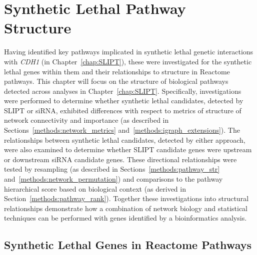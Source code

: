 \chapter{Synthetic Lethal Pathway Structure}
\label{chap:Pathways}
  
Having identified key \glspl{pathway} implicated in \gls{synthetic lethal} genetic interactions with \textit{CDH1} (in Chapter~\ref{chap:SLIPT}), these were investigated for the \gls{synthetic lethal} genes within them and their relationships to  structure in Reactome \glspl{pathway}. This chapter will focus on the  structure of biological \glspl{pathway} detected across analyses in Chapter~\ref{chap:SLIPT}. 
%
Specifically, investigations were performed to determine whether \gls{synthetic lethal} candidates, detected by \gls{SLIPT} or \gls{siRNA}, exhibited differences with respect to metrics of  structure of network connectivity and importance (as described in Sections~\ref{methods:network_metrics} and~\ref{methods:igraph_extensions}). The relationships between \gls{synthetic lethal} candidates, detected by either approach, were also examined to determine whether \gls{SLIPT} candidate genes were upstream or downstream \gls{siRNA} candidate genes. These directional relationships were tested by resampling (as described in Sections~\ref{methods:pathway_str} and~\ref{methods:network_permutation}) and comparisons to the \gls{pathway} hierarchical score based on biological context (as derived in Section~\ref{methods:pathway_rank}). 
%
Together these investigations into structural relationships demonstrate how a combination of network biology and statistical techniques can be performed with genes identified by a \gls{bioinformatics} analysis.

\FloatBarrier

\section{Synthetic Lethal Genes in Reactome Pathways} \label{chapt4:SL_Genes}

\FloatBarrier


